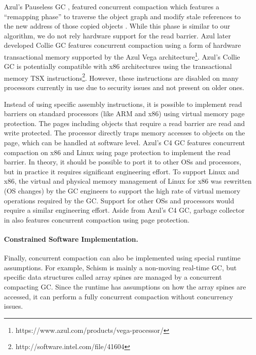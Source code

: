 \documentclass[sigplan,10pt,review,anonymous]{acmart}\settopmatter{printfolios=true,printccs=false,printacmref=false}
\newcommand{\egb}[1]{\color{blue}\fbox{\bfseries\sffamily\scriptsize Elisa:}{\sf\small$\blacktriangleright$\textit{#1}$\blacktriangleleft$}\color{black}}
\begin{document}
Azul's Pauseless GC \cite{AzulHardwareReadBarrierConcCompact}, featured concurrent compaction which features a ``remapping phase'' to traverse the object graph and modify stale references to the new address of those copied objects .
While this phase is similar to our algorithm, we do not rely hardware support for the read barrier. 
Azul later developed Collie GC \cite{AzulSTMConcCompact} features concurrent compaction using a form of hardware transactional memory supported by the Azul Vega architecture\footnote{https://www.azul.com/products/vega-processor/}. 
Azul's Collie GC is potentially compatible with x86 architectures using the transactional memory TSX instructions\footnote{http://software.intel.com/file/41604}.
However, these instructions are disabled on many processors currently in use due to security issues and not present on older ones.

 Instead of using specific assembly instructions, it is possible to implement read barriers on standard processors (like ARM and x86) using virtual memory page protection. The pages including objects that require a read barrier are read and write protected. The processor directly traps memory accesses to objects on the page, which can be handled at software level. 
Azul's C4 GC \cite{AzulVirtualMemConcCompact} features concurrent compaction on x86 and Linux using page protection to implement the read barrier. In theory, it should be possible to port it to other OSs and processors, but in practice it requires significant engineering effort. To support Linux and x86, the virtual and physical memory management of Linux for x86 was rewritten (OS changes) by the GC engineers to support the high rate of virtual memory operations required by the GC. Support for other OSs and processors would require a similar engineering effort.
Aside from Azul's C4 GC, garbage collector in \cite{CompressorVirtualMemConcCompact} also features concurrent compaction using page protection.

\paragraph{Constrained Software Implementation.}
Finally, concurrent compaction can also be implemented using special runtime assumptions. For example, Schism \cite{SchismRTGC} is mainly a non-moving real-time GC, but specific data structures called array spines are managed by a concurrent compacting GC. Since the runtime has assumptions on how the array spines are accessed, it can perform a fully concurrent compaction without concurrency issues.
\end{document}
